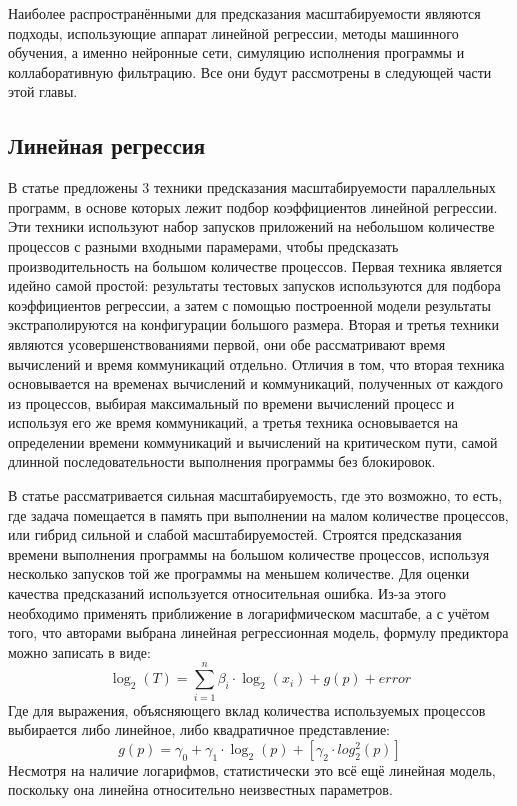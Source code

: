 	Наиболее распространёнными для предсказания масштабируемости являются подходы, использующие аппарат линейной регрессии, методы машинного обучения, а именно нейронные сети, симуляцию исполнения программы и коллаборативную фильтрацию. Все они будут рассмотрены в следующей части этой главы.

	\subsection{Линейная регрессия}
		В статье \cite{log_main} предложены 3 техники предсказания масштабируемости параллельных программ, в основе которых лежит подбор коэффициентов линейной регрессии. Эти техники используют набор запусков приложений на небольшом количестве процессов с разными входными парамерами, чтобы предсказать производительность на большом количестве процессов. Первая техника является идейно самой простой: результаты тестовых запусков используются для подбора коэффициентов регрессии, а затем с помощью построенной модели результаты экстраполируются на конфигурации большого размера. Вторая и третья техники являются усовершенствованиями первой, они обе рассматривают время вычислений и время коммуникаций отдельно. Отличия в том, что вторая техника основывается на временах вычислений и коммуникаций, полученных от каждого из процессов, выбирая максимальный по времени вычислений процесс и используя его же время коммуникаций, а третья техника основывается на определении времени коммуникаций и вычислений на критическом пути, самой длинной последовательности выполнения программы без блокировок.

		В статье рассматривается сильная масштабируемость, где это возможно, то есть, где задача помещается в память при выполнении на малом количестве процессов, или гибрид сильной и слабой масштабируемостей. Строятся предсказания времени выполнения программы на большом количестве процессов, используя несколько запусков той же программы на меньшем количестве. Для оценки качества предсказаний используется относительная ошибка. Из-за этого необходимо применять приближение в логарифмическом масштабе, а с учётом того, что авторами выбрана линейная регрессионная модель, формулу предиктора можно записать в виде:
		\[
		\log_2{(T)} = \sum_{i=1}^{n}{\beta_i \cdot \log_2{(x_i)}} + g(p) + error
		\]
		Где для выражения, объясняющего вклад количества используемых процессов выбирается либо линейное, либо квадратичное представление:
		\[
		g(p) = \gamma_0 + \gamma_1 \cdot \log_2(p) + [\gamma_2 \cdot log_2^2(p)]
		\]
		Несмотря на наличие логарифмов, статистически это всё ещё линейная модель, поскольку она линейна относительно неизвестных параметров.


